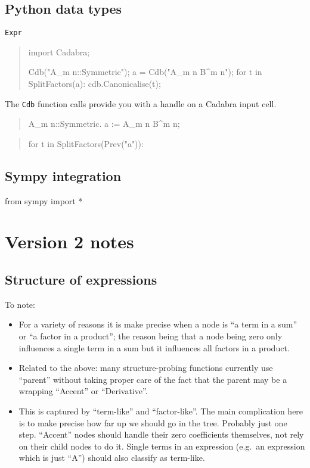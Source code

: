 \documentclass[11pt]{article}
\begin{document}
\subsection{Python data types}

\begin{description}
\item[{\tt Expr}] 
\end{description}


\begin{quote}
import Cadabra;


Cdb("A_{m n}::Symmetric");
a = Cdb("A_{m n} B^{m n}");
for t in SplitFactors(a):
    cdb.Canonicalise(t);

\end{quote}
The {\tt Cdb} function calls provide you with a handle on 
a Cadabra input cell. 

\begin{quote}
A_{m n}::Symmetric.
a := A_{m n} B^{m n};
\end{quote}
\begin{quote}
for t in SplitFactors(Prev("a")):
   
\end{quote}


\subsection{Sympy integration}

from sympy import *




\section{Version 2 notes}

\subsection{Structure of expressions}

To note:
\begin{itemize}
\item For a variety of reasons it is make precise when a node is ``a
  term in a sum'' or ``a factor in a product''; the reason being that
  a node being zero only influences a single term in a sum but it
  influences all factors in a product. 

\item Related to the above: many structure-probing functions currently
  use ``parent'' without taking proper care of the fact that the
  parent may be a wrapping ``Accent'' or ``Derivative''. 

\item This is captured by ``term-like'' and ``factor-like''. The main
  complication here is to make precise how far up we should go in the
  tree. Probably just one step. ``Accent'' nodes should handle their
  zero coefficients themselves, not rely on their child nodes to do
  it. Single terms in an expression (e.g.~an expression which is just
  ``A'') should also classify as term-like.
\end{itemize}
\end{document}

